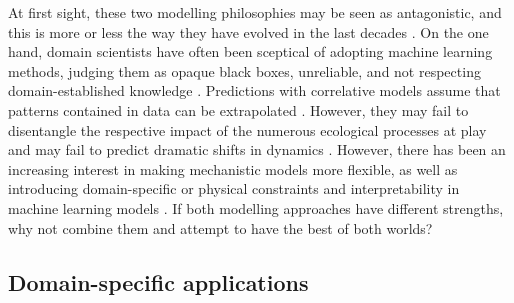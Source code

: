 At first sight, these two modelling philosophies may be seen as antagonistic, and this is more or less the way they have evolved in the last decades \cite{zdeborova_understanding_2020}. 
On the one hand, domain scientists have often been sceptical of adopting machine learning methods, judging them as opaque black boxes, unreliable, and not respecting domain-established knowledge \cite{Coveney:2016eb}. 
Predictions with correlative models assume that patterns contained in data can be extrapolated \cite{dormann2007}. 
However, they may fail to disentangle the respective impact of the numerous ecological processes at play and may fail to predict dramatic shifts in dynamics \cite{Barnosky2012}.
However, there has been an increasing interest in making mechanistic models more flexible, as well as introducing domain-specific or physical constraints and interpretability in machine learning models \cite{Molnar.2020sisk,Rudin.2022,Schneider2017,rasp2018,Yazdani2020,Abarbanel2018,Carrassi2018,Bocquet2019,Gabor2015,Gharamti2017,Curtsdotter2019,Rosenbaum2019,Toms2020,Brajard2021}.
If both modelling approaches have different strengths, why not combine them and attempt to have the best of both worlds?


\subsection{Domain-specific applications}

